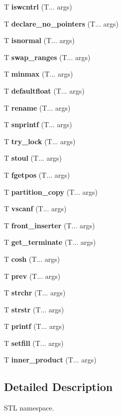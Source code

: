 \begin{DoxyCompactItemize}
T \textbf{ iswcntrl} (T... args)
\item 
\mbox{\label{declare_no_pointers}} 
T \textbf{ declare\+\_\+no\+\_\+pointers} (T... args)
\item 
\mbox{\label{isnormal}} 
T \textbf{ isnormal} (T... args)
\item 
\mbox{\label{swap_ranges}} 
T \textbf{ swap\+\_\+ranges} (T... args)
\item 
\mbox{\label{minmax}} 
T \textbf{ minmax} (T... args)
\item 
\mbox{\label{fixed}} 
T \textbf{ defaultfloat} (T... args)
\item 
\mbox{\label{rename}} 
T \textbf{ rename} (T... args)
\item 
\mbox{\label{fprintf}} 
T \textbf{ snprintf} (T... args)
\item 
\mbox{\label{try_lock}} 
T \textbf{ try\+\_\+lock} (T... args)
\item 
\mbox{\label{stoul}} 
T \textbf{ stoul} (T... args)
\item 
\mbox{\label{fgetpos}} 
T \textbf{ fgetpos} (T... args)
\item 
\mbox{\label{partition_copy}} 
T \textbf{ partition\+\_\+copy} (T... args)
\item 
\mbox{\label{vfscanf}} 
T \textbf{ vscanf} (T... args)
\item 
\mbox{\label{front_inserter}} 
T \textbf{ front\+\_\+inserter} (T... args)
\item 
\mbox{\label{get_terminate}} 
T \textbf{ get\+\_\+terminate} (T... args)
\item 
\mbox{\label{cosh}} 
T \textbf{ cosh} (T... args)
\item 
\mbox{\label{prev}} 
T \textbf{ prev} (T... args)
\item 
\mbox{\label{strchr}} 
T \textbf{ strchr} (T... args)
\item 
\mbox{\label{strstr}} 
T \textbf{ strstr} (T... args)
\item 
\mbox{\label{fprintf}} 
T \textbf{ printf} (T... args)
\item 
\mbox{\label{setfill}} 
T \textbf{ setfill} (T... args)
\item 
\mbox{\label{inner_product}} 
T \textbf{ inner\+\_\+product} (T... args)
\end{DoxyCompactItemize}


\subsection{Detailed Description}
S\+TL namespace. 